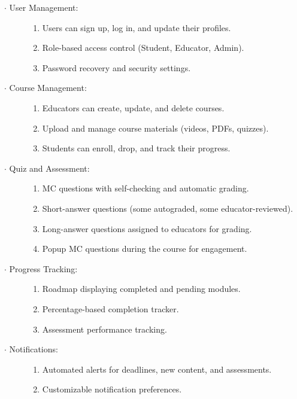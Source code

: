 \documentclass[a4paper, 11pt]{scrreprt}
\begin{document}
\begin{description}
    \item[$\cdot$ User Management:]
        \begin{enumerate}
            \item Users can sign up, log in, and update their profiles.
            \item Role-based access control (Student, Educator, Admin).
            \item Password recovery and security settings.
        \end{enumerate}
    \item[$\cdot$ Course Management:]
        \begin{enumerate}
            \item Educators can create, update, and delete courses.
            \item Upload and manage course materials (videos, PDFs, quizzes).
            \item Students can enroll, drop, and track their progress.
        \end{enumerate}
    \item[$\cdot$ Quiz and Assessment:]
        \begin{enumerate}
            \item MC questions with self-checking and automatic grading.
            \item Short-answer questions (some autograded, some educator-reviewed).
            \item Long-answer questions assigned to educators for grading.
            \item Popup MC questions during the course for engagement.
        \end{enumerate}
    \item[$\cdot$ Progress Tracking:]
        \begin{enumerate}
            \item Roadmap displaying completed and pending modules.
            \item Percentage-based completion tracker.
            \item Assessment performance tracking.
        \end{enumerate}
    \item[$\cdot$ Notifications:]
        \begin{enumerate} 
            \item Automated alerts for deadlines, new content, and assessments.
            \item Customizable notification preferences.

\end{enumerate}
\end{description}
\end{document}
